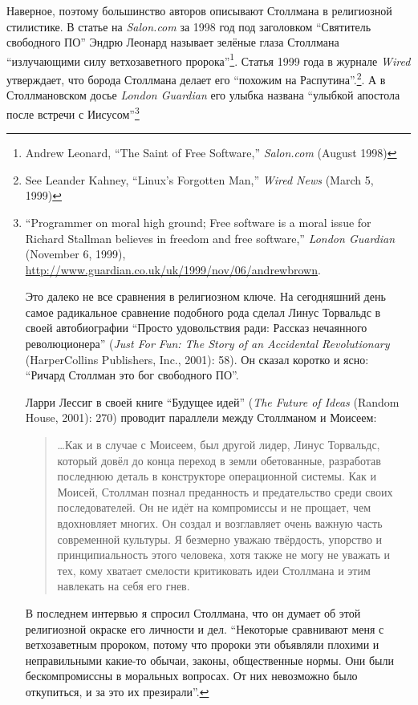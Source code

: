 Наверное, поэтому большинство авторов описывают Столлмана в религиозной стилистике. В статье на \textit{Salon.com} за 1998 год под заголовком \enquote{Святитель свободного ПО} Эндрю Леонард называет зелёные глаза Столлмана \enquote{излучающими силу ветхозаветного пророка}\footnote{Andrew Leonard, \enquote{The Saint of Free Software,} \textit{Salon.com} (August 1998)}. Статья 1999 года в журнале \textit{Wired} утверждает, что борода Столлмана делает его \enquote{похожим на Распутина}.\footnote{See Leander Kahney, \enquote{Linux's Forgotten Man,} \textit{Wired News} (March 5, 1999)}. А в Столлмановском досье \textit{London Guardian} его улыбка названа \enquote{улыбкой апостола после встречи с Иисусом}\footnote{\enquote{Programmer on moral high ground; Free software is a moral issue for Richard Stallman believes in freedom and free software,} \textit{London Guardian} (November 6, 1999), \url{http://www.guardian.co.uk/uk/1999/nov/06/andrewbrown}.

Это далеко не все сравнения в религиозном ключе. На сегодняшний день самое радикальное сравнение подобного рода сделал Линус Торвальдс в своей автобиографии \enquote{Просто удовольствия ради: Рассказ нечаянного революционера} (\textit{Just For Fun: The Story of an Accidental Revolutionary} (HarperCollins Publishers, Inc., 2001): 58). Он сказал коротко и ясно: \enquote{Ричард Столлман это бог свободного ПО}.

Ларри Лессиг в своей книге \enquote{Будущее идей} (\textit{The Future of Ideas} (Random House, 2001): 270) проводит параллели между Столлманом и Моисеем:

\begin{quote}

\ldots Как и в случае с Моисеем, был другой лидер, Линус Торвальдс, который довёл до конца переход в земли обетованные, разработав последнюю деталь в конструкторе операционной системы. Как и Моисей, Столлман познал преданность и предательство среди своих последователей. Он не идёт на компромиссы и не прощает, чем вдохновляет многих. Он создал и возглавляет очень важную часть современной культуры. Я безмерно уважаю твёрдость, упорство и принципиальность этого человека, хотя также не могу не уважать и тех, кому хватает смелости критиковать идеи Столлмана и этим навлекать на себя его гнев.

\end{quote}

В последнем интервью я спросил Столлмана, что он думает об этой религиозной окраске его личности и дел. \enquote{Некоторые сравнивают меня с ветхозаветным пророком, потому что пророки эти объявляли плохими и неправильными какие-то обычаи, законы, общественные нормы. Они были бескомпромиссны в моральных вопросах. От них невозможно было откупиться, и за это их презирали}.}

